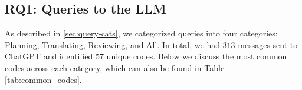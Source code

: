 \documentclass[manuscript,screen,acmsmall]{acmart}
\begin{document}
\subsection{RQ1: Queries to the LLM}
    As described in \ref{sec:query-cats}, we categorized queries into four categories: Planning, Translating, Reviewing, and All.
    In total, we had $313$ messages sent to ChatGPT and identified $57$ unique codes.
    Below we discuss the most common codes across each category, which can also be found in Table \ref{tab:common_codes}.
    
\end{document}
